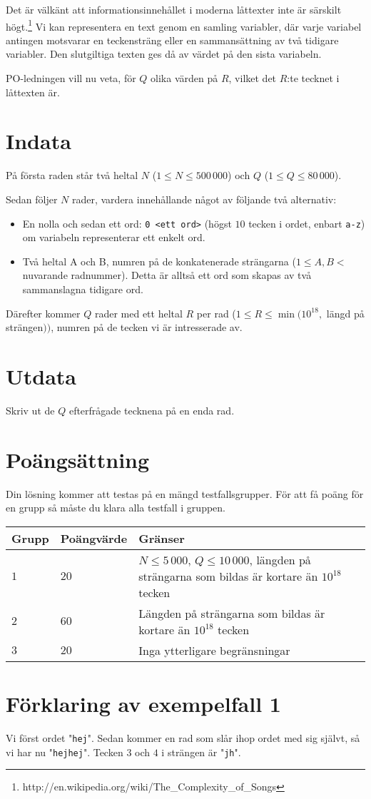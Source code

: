 Det är välkänt att informationsinnehållet i moderna låttexter inte är särskilt
högt.\footnote{http://en.wikipedia.org/wiki/The\_Complexity\_of\_Songs}
Vi kan representera en text genom en samling variabler, där varje
variabel antingen motsvarar en teckensträng eller en sammansättning av två
tidigare variabler. Den slutgiltiga texten ges då av värdet på den sista
variabeln.

PO-ledningen vill nu veta, för $Q$ olika värden på $R$, vilket det $R$:te tecknet i
låttexten är.

\section*{Indata}

På första raden står två heltal $N$ ($1 \leq N \leq 500\,000$) och $Q$ ($1 \leq Q
\leq 80\,000$).

Sedan följer $N$ rader, vardera innehållande något av följande två alternativ:

\begin{itemize}
\item En nolla och sedan ett ord: \texttt{0 <ett ord>} (högst $10$ tecken i
      ordet, enbart \texttt{a-z}) om variabeln representerar ett enkelt ord.
\item Två heltal A och B, numren på de konkatenerade strängarna
      ($1 \leq A, B < $ nuvarande radnummer). Detta är alltså ett ord som skapas
      av två sammanslagna tidigare ord.
\end{itemize}

Därefter kommer $Q$ rader med ett heltal $R$ per rad ($1 \leq R \leq \min(10^{18},$ längd på
strängen$))$, numren på de tecken vi är intresserade av.

\section*{Utdata}

Skriv ut de $Q$ efterfrågade tecknena på en enda rad.

\section*{Poängsättning}
Din lösning kommer att testas på en mängd testfallsgrupper.
För att få poäng för en grupp så måste du klara alla testfall i gruppen.

\noindent
\begin{tabular}{| l | l | l |}
  \hline
  Grupp & Poängvärde & Gränser \\ \hline
  $1$   & $20$       & $N \leq 5\,000$, $Q \leq 10\,000$, längden på strängarna som bildas är kortare än $10^{18}$ tecken \\ \hline
  $2$   & $60$       & Längden på strängarna som bildas är kortare än $10^{18}$ tecken \\ \hline
  $3$   & $20$       & Inga ytterligare begränsningar \\ \hline
\end{tabular}

\section*{Förklaring av exempelfall 1}
Vi först ordet "\texttt{hej}". Sedan kommer en rad som slår ihop
ordet med sig självt, så vi har nu "\texttt{hejhej}". Tecken $3$ och $4$ i strängen är "\texttt{jh}".